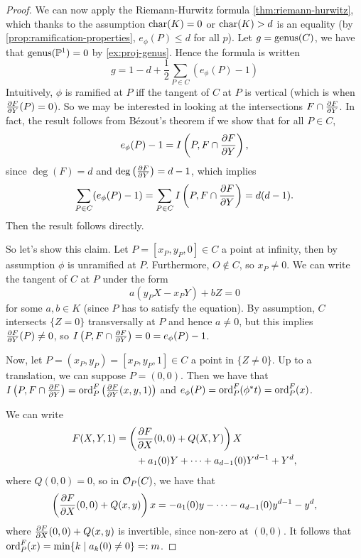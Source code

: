 \begin{proof}
	We can now apply the Riemann-Hurwitz formula \ref{thm:riemann-hurwitz}, which
	thanks to the assumption $\operatorname{char}(K) = 0$ or $\operatorname{char}(K) > d$ is an equality
	(by \ref{prop:ramification-properties}, $e_\phi(P) \leq d$ for all $p$).
	Let $g = \operatorname{genus}(C)$, we have that $\operatorname{genus}(\mathbb{P}^1) = 0$ by
	\ref{ex:proj-genus}.
	Hence the formula is written
	\begin{equation*}
		g = 1 - d + \frac{1}{2}\sum_{P \in C}(e_\phi(P) - 1)
	\end{equation*}
	Intuitively, $\phi$ is ramified at $P$ iff the tangent of $C$ at $P$ is 
	vertical (which is when $\frac{\partial F}{\partial Y}(P) = 0$).
	So we may be interested in looking 
	at the intersections $F \cap \frac{\partial F}{\partial Y}$.
	In fact, the result follows from Bézout's theorem if we show that
	for all $P \in C$,
	\begin{equation*}
		e_\phi(P) - 1 = I\left(P, F\cap\frac{\partial F}{\partial Y}\right),
	\end{equation*}
	since $\deg(F) = d$ and $\deg\left(\frac{\partial F}{\partial Y}\right) = d-1$,
	which implies
	\begin{equation*}
		\sum_{P \in C}(e_\phi(P) - 1) 
		= \sum_{P \in C} I\left(P, F \cap \frac{\partial F}{\partial Y}\right)
		= d(d-1).
	\end{equation*}
	Then the result follows directly.

	So let's show this claim. Let $P = [x_P, y_P, 0] \in C$ a point at infinity,
	then by assumption $\phi$ is unramified at $P$. Furthermore, $O \notin C$, so
	$x_P \neq 0$. We can write the tangent of $C$ at $P$ under the form
	\begin{equation*}
		a(y_PX - x_PY) + bZ = 0
	\end{equation*}
	for some $a, b \in K$ (since $P$ has to satisfy the
	equation). By assumption, $C$ intersects $\{Z = 0\}$ transversally at $P$
	and hence $a \neq 0$, but this implies $\frac{\partial F}{\partial Y}(P) \neq 0$,
	so $I\left(P, F\cap \frac{\partial F}{\partial Y}\right) = 0 = e_{\phi}(P) - 1$.

	Now, let $P = (x_P, y_P) = [x_P, y_P, 1] \in C$ a point in $\{Z \neq 0\}$.
	Up to a translation, we can suppose $P = (0, 0)$.
	Then we have that $I\left(P, F\cap \frac{\partial F}{\partial Y}\right) =
	\operatorname{ord}_P^F\left(\frac{\partial F}{\partial Y}(x, y, 1)\right)$ and
	$e_\phi(P) = \operatorname{ord}_P^F(\phi^*t) = \operatorname{ord}_P^F(x)$.

	We can write
	\begin{align*}
		F(X, Y, 1) &= \left(\frac{\partial F}{\partial X}(0, 0) + Q(X, Y)\right)X\\
		&\qquad+ a_1(0)Y + \dots + a_{d-1}(0)Y^{d-1} + Y^d,
	\end{align*}
	where $Q(0, 0) = 0$,
	so in $\mathcal{O}_P(C)$, we have that
	\begin{equation*}
		\left(\frac{\partial F}{\partial X}(0, 0) + Q(x, y)\right)x = 
		- a_1(0)y - \dots - a_{d-1}(0)y^{d-1} - y^d,
	\end{equation*}
	where $\frac{\partial F}{\partial X}(0, 0) + Q(x, y)$ is invertible, since non-zero at
	$(0, 0)$.
	It follows that $\operatorname{ord}_P^F(x) = \min\{k \mid a_k(0) \neq 0\} =: m$.


\end{proof}

